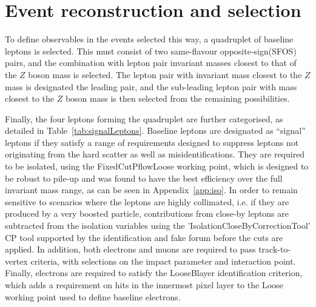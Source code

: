\section{Event reconstruction and selection}


To define observables in the events selected this way, a quadruplet of baseline leptons is selected. 
This must consist of two same-flavour opposite-sign(SFOS) pairs, and the combination with lepton pair invariant masses closest to that of the $Z$ boson mass is selected. The lepton pair with invariant mass closest to the $Z$ mass is designated the leading pair, and the sub-leading lepton pair with mass closest to the $Z$ boson mass is then selected from the remaining possibilities.

Finally, the four leptons forming the quadruplet are further categorised, as detailed in Table~\ref{tab:signalLeptons}. 
Baseline leptons are designated as ``signal'' leptons if they satisfy a range of requirements designed to suppress leptons not originating from the hard scatter as well as misidentifications.
They are required to be isolated, using the FixedCutPflowLoose working point, which is designed to be robust to pile-up and was found to have the best efficiency over the full invariant mass range, as can be seen in Appendix~\ref{app:iso}. In order to remain sensitive to scenarios where the leptons are highly collimated, i.e. if they are produced by a very boosted particle, contributions from close-by leptons are subtracted from the isolation variables using the 'IsolationCloseByCorrectionTool' CP tool supported by the identification and fake forum before the cuts are applied. In addition, both electrons and muons are required to pass track-to-vertex criteria, with selections on the impact parameter and interaction point. Finally, electrons are required to satisfy the LooseBlayer identification criterion, which adds a requirement on hits in the innermost pixel layer to the Loose working point used to define baseline electrons. 

